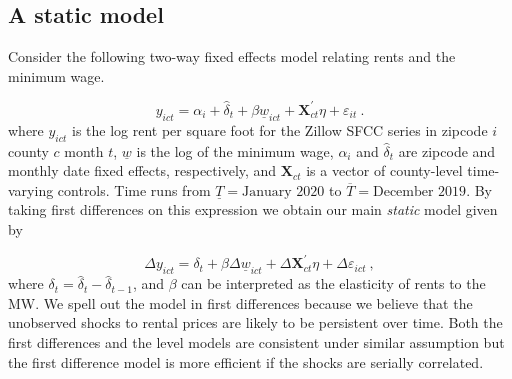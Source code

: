 \subsection{A static model}
Consider the following two-way fixed effects model relating rents and the minimum wage.

\begin{equation*} \label{eq:did_lev}
    y_{ict} = \alpha_i + \hat{\delta}_t 
    		+ \beta \underline{w}_{ict} 
    		+ \mathbf{X}^{'}_{ct}\eta 
    		+ \varepsilon_{it} \ .
\end{equation*}    
where $y_{ict}$ is the log rent per square foot for the Zillow SFCC series in zipcode 
$i$ county $c$ month $t$, $\underline{w}$ is the log of the minimum wage, $\alpha_i$ and 
$\hat{\delta}_t$ are zipcode and monthly date fixed effects, respectively, and 
$\mathbf{X}_{ct}$ is a vector of county-level time-varying controls. Time runs from 
$\underline{T} = \text{January 2020}$ to $\overline{T} = \text{December 2019}$. By taking 
first differences on this expression we obtain our main \textit{static} model given by
    
\begin{equation}\label{eq:did}
	\Delta y_{ict} = \delta_t
				   + \beta \Delta \underline{w}_{ict}
				   + \Delta \mathbf{X}^{'}_{ct} \eta
				   + \Delta \varepsilon_{ict} \ ,
\end{equation}
where $\delta_t = \hat{\delta}_t - \hat{\delta}_{t-1}$, and $\beta$ can be interpreted 
as the elasticity of rents to the MW. We spell out the model in first differences because 
we believe that the unobserved shocks to rental prices are likely to be persistent over 
time. Both the first differences and the level models are consistent under similar assumption 
but the first difference model is more efficient if the shocks are serially correlated.

